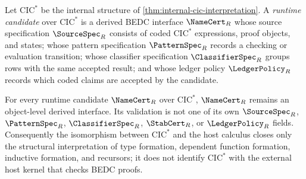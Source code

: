 \begin{definition}
\label{def:reflection-runtime-candidate}
Let $\mathrm{CIC}^{*}$ be the internal structure of \autoref{thm:internal-cic-interpretation}. A \emph{runtime candidate} over $\mathrm{CIC}^{*}$ is a derived BEDC interface $\NameCert_R$ whose source specification $\SourceSpec_R$ consists of coded $\mathrm{CIC}^{*}$ expressions, proof objects, and states; whose pattern specification $\PatternSpec_R$ records a checking or evaluation transition; whose classifier specification $\ClassifierSpec_R$ groups rows with the same accepted result; and whose ledger policy $\LedgerPolicy_R$ records which coded claims are accepted by the candidate.
\end{definition}

\begin{theorem}
\label{thm:reflection-structure-existence-boundary}
For every runtime candidate $\NameCert_R$ over $\mathrm{CIC}^{*}$, $\NameCert_R$ remains an object-level derived interface. Its validation is not one of its own $\SourceSpec_R$, $\PatternSpec_R$, $\ClassifierSpec_R$, $\StabCert_R$, or $\LedgerPolicy_R$ fields. Consequently the isomorphism between $\mathrm{CIC}^{*}$ and the host calculus closes only the structural interpretation of type formation, dependent function formation, inductive formation, and recursors; it does not identify $\mathrm{CIC}^{*}$ with the external host kernel that checks BEDC proofs.
\end{theorem}

